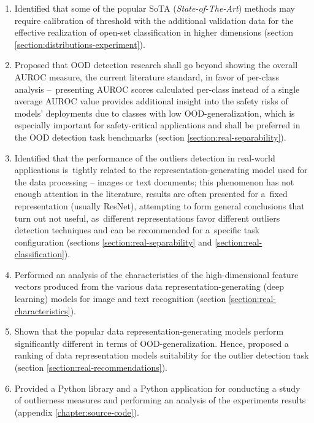 \begin{enumerate}
    \item Identified that some of the popular SoTA (\textit{State-of-The-Art}) methods may require calibration of threshold with the additional validation data for the effective realization of open-set classification in higher dimensions (section \ref{section:distributions-experiment}).
    \item Proposed that OOD detection research shall go beyond showing the overall AUROC measure, the current literature standard, in favor of per-class analysis –~presenting AUROC scores calculated per-class instead of a single average AUROC value provides additional insight into the safety risks of models' deployments due to classes with low OOD-generalization, which is especially important for safety-critical applications and shall be preferred in the OOD detection task benchmarks (section \ref{section:real-separability}).
    \item Identified that the performance of the outliers detection in real-world applications is~tightly related to the representation-generating model used for the data processing – images or text documents; this phenomenon has not enough attention in the literature, results are often presented for a~fixed representation (usually ResNet), attempting to form general conclusions that turn out not useful, as~different representations favor different outliers detection techniques and can be recommended for a~specific task configuration (sections \ref{section:real-separability} and \ref{section:real-classification}).
    \item Performed an analysis of the characteristics of the high-dimensional feature vectors produced from the various data representation-generating (deep learning) models for image and text recognition (section \ref{section:real-characteristics}).
    \item Shown that the popular data representation-generating models perform significantly different in terms of OOD-generalization. Hence, proposed a ranking of data representation models suitability for the outlier detection task (section \ref{section:real-recommendations}).
    \item Provided a Python library and a Python application for conducting a study of outlierness measures and performing an analysis of the experiments results (appendix \ref{chapter:source-code}).
\end{enumerate}

